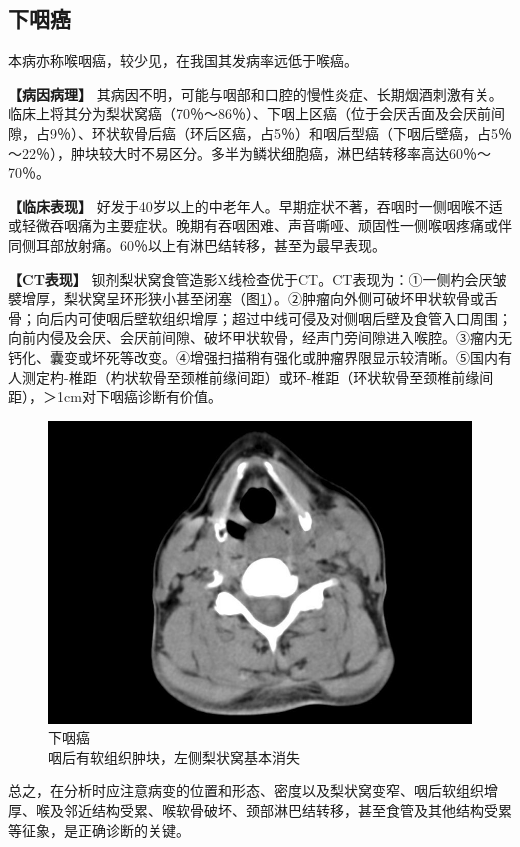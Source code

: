 \subsection{下咽癌}

本病亦称喉咽癌，较少见，在我国其发病率远低于喉癌。

\textbf{【病因病理】}
其病因不明，可能与咽部和口腔的慢性炎症、长期烟酒刺激有关。临床上将其分为梨状窝癌（70％～86％）、下咽上区癌（位于会厌舌面及会厌前间隙，占9％）、环状软骨后癌（环后区癌，占5％）和咽后型癌（下咽后壁癌，占5％～22％），肿块较大时不易区分。多半为鳞状细胞癌，淋巴结转移率高达60％～70％。

\textbf{【临床表现】}
好发于40岁以上的中老年人。早期症状不著，吞咽时一侧咽喉不适或轻微吞咽痛为主要症状。晚期有吞咽困难、声音嘶哑、顽固性一侧喉咽疼痛或伴同侧耳部放射痛。60％以上有淋巴结转移，甚至为最早表现。

\textbf{【CT表现】}
钡剂梨状窝食管造影X线检查优于CT。CT表现为：①一侧杓会厌皱襞增厚，梨状窝呈环形狭小甚至闭塞（图\ref{fig6-9}）。②肿瘤向外侧可破坏甲状软骨或舌骨；向后内可使咽后壁软组织增厚；超过中线可侵及对侧咽后壁及食管入口周围；向前内侵及会厌、会厌前间隙、破坏甲状软骨，经声门旁间隙进入喉腔。③瘤内无钙化、囊变或坏死等改变。④增强扫描稍有强化或肿瘤界限显示较清晰。⑤国内有人测定杓-椎距（杓状软骨至颈椎前缘间距）或环-椎距（环状软骨至颈椎前缘间距），＞1cm对下咽癌诊断有价值。

\begin{figure}[!htbp]
 \centering
 \includegraphics[width=.7\textwidth,height=\textheight,keepaspectratio]{./images/Image00151.jpg}
 \captionsetup{justification=centering}
 \caption{下咽癌\\{\small 咽后有软组织肿块，左侧梨状窝基本消失}}
 \label{fig6-9}
  \end{figure} 

总之，在分析时应注意病变的位置和形态、密度以及梨状窝变窄、咽后软组织增厚、喉及邻近结构受累、喉软骨破坏、颈部淋巴结转移，甚至食管及其他结构受累等征象，是正确诊断的关键。

